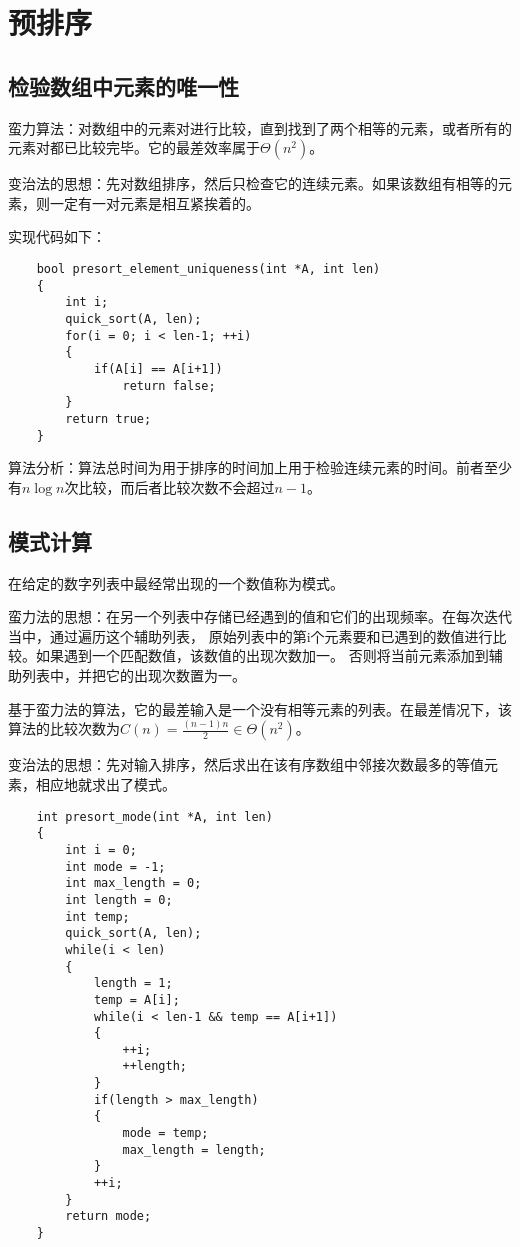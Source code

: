 \documentclass[a4paper,left=2.5cm,right=2.5cm,11pt]{article}
\begin{document}
\tableofcontents

\clearpage

\section{预排序}
\subsection{检验数组中元素的唯一性}
	蛮力算法：对数组中的元素对进行比较，直到找到了两个相等的元素，或者所有的元素对都已比较完毕。它的最差效率属于$\Theta(n^2)$。\par
	变治法的思想：先对数组排序，然后只检查它的连续元素。如果该数组有相等的元素，则一定有一对元素是相互紧挨着的。\par
	实现代码如下：
	\begin{lstlisting}
	bool presort_element_uniqueness(int *A, int len)
	{
		int i;
		quick_sort(A, len);
		for(i = 0; i < len-1; ++i)
		{
			if(A[i] == A[i+1])
				return false;
		}
		return true;
	}
	\end{lstlisting}

	算法分析：算法总时间为用于排序的时间加上用于检验连续元素的时间。前者至少有$n\log n$次比较，而后者比较次数不会超过$n-1$。

\subsection{模式计算}
	在给定的数字列表中最经常出现的一个数值称为模式。\par
	蛮力法的思想：在另一个列表中存储已经遇到的值和它们的出现频率。在每次迭代当中，通过遍历这个辅助列表，
	原始列表中的第i个元素要和已遇到的数值进行比较。如果遇到一个匹配数值，该数值的出现次数加一。
	否则将当前元素添加到辅助列表中，并把它的出现次数置为一。\par
	基于蛮力法的算法，它的最差输入是一个没有相等元素的列表。在最差情况下，该算法的比较次数为$C(n) = \frac{(n-1)n}{2} \in \Theta(n^2)$。\par
	变治法的思想：先对输入排序，然后求出在该有序数组中邻接次数最多的等值元素，相应地就求出了模式。

	\begin{lstlisting}
	int presort_mode(int *A, int len)
	{
		int i = 0;
		int mode = -1;
		int max_length = 0;
		int length = 0;
		int temp;
		quick_sort(A, len);
		while(i < len)
		{
			length = 1;
			temp = A[i];
			while(i < len-1 && temp == A[i+1])
			{
				++i;
				++length;
			}
			if(length > max_length)
			{
				mode = temp;
				max_length = length;
			}
			++i;
		}
		return mode;
	}
	\end{lstlisting}
\end{document}
